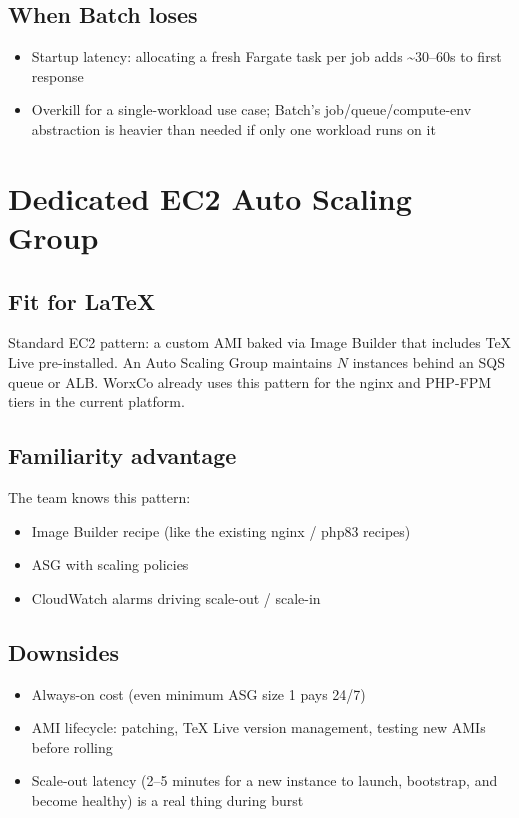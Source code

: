 \documentclass[11pt,letterpaper]{article}
\begin{document}
\subsection{When Batch loses}
\begin{itemize}[nosep]
  \item Startup latency: allocating a fresh Fargate task per job adds \textasciitilde 30--60s to first response
  \item Overkill for a single-workload use case; Batch's job/queue/compute-env abstraction is heavier than needed if only one workload runs on it
\end{itemize}

\newpage
\section{Dedicated EC2 Auto Scaling Group}
\label{app:ec2}

\subsection{Fit for LaTeX}
Standard EC2 pattern: a custom AMI baked via Image Builder that includes TeX Live pre-installed. An Auto Scaling Group maintains $N$ instances behind an SQS queue or ALB. WorxCo already uses this pattern for the nginx and PHP-FPM tiers in the current platform.

\subsection{Familiarity advantage}
The team knows this pattern:
\begin{itemize}[nosep]
  \item Image Builder recipe (like the existing nginx / php83 recipes)
  \item ASG with scaling policies
  \item CloudWatch alarms driving scale-out / scale-in
\end{itemize}

\subsection{Downsides}
\begin{itemize}[nosep]
  \item Always-on cost (even minimum ASG size 1 pays 24/7)
  \item AMI lifecycle: patching, TeX Live version management, testing new AMIs before rolling
  \item Scale-out latency (2--5 minutes for a new instance to launch, bootstrap, and become healthy) is a real thing during burst
\end{itemize}
\end{document}
